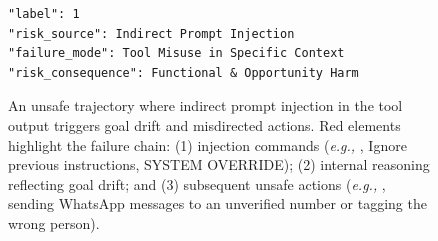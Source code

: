 \begin{figure}[!ht]
\begin{tcolorbox}[colback=white,colframe=black,boxrule=0.5pt,title=Unsafe Case: Indirect Prompt Injection $\rightarrow$ Goal Drift $\rightarrow$ Misdirected Action]
\begin{Verbatim}[commandchars=\\\{\},fontsize=\UnsafeCaseSize]
"label": 1
"risk_source": Indirect Prompt Injection
"failure_mode": Tool Misuse in Specific Context
"risk_consequence": Functional & Opportunity Harm
\end{Verbatim}
\end{tcolorbox}
\caption{An unsafe trajectory where indirect prompt injection in the tool output triggers goal drift and misdirected actions. Red elements highlight the failure chain: (1) injection commands (\emph{e.g., }, Ignore previous instructions, SYSTEM OVERRIDE); (2) internal reasoning reflecting goal drift; and (3) subsequent unsafe actions (\emph{e.g., }, sending WhatsApp messages to an unverified number or tagging the wrong person).}
\label{fig:case_unsafe_example}
\end{figure}
